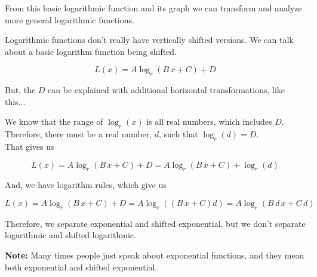 \documentclass{ximera}
\begin{document}
From this basic logarithmic function and its graph we can transform and analyze more general logarithmic functions.







\begin{fact}


Logarithmic functions don't really have vertically shifted versions.  We can talk about a basic logarithm function being shifted.

\[
L(x) = A \log_r(B \, x + C) + D
\]


But, the $D$ can be explained with additional horizontal transformations, like this... \\


\begin{explanation}

We know that the range of $\log_r(x)$ is all real numbers, which includes $D$.  Therefore, there must be a real number, $d$, such that $\log_r(d) = D$. \\


That gives us 



\[
L(x) = A \log_r(B \, x + C) + D = A \log_r(B \, x + C) + \log_r(d)
\]

And, we have logarithm rules, which give us


\[
L(x) = A \log_r(B \, x + C) + D = A \log_r((B \, x + C)d) = A \log_r(B \, d \, x + C \, d) 
\]

\end{explanation}

Therefore, we separate exponential and shifted exponential, but we don't separate logarithmic and shifted logarithmic.

\end{fact}


\textbf{Note:}  Many times people just speak about exponential functions, and they mean both exponential and shifted exponential.
\end{document}
